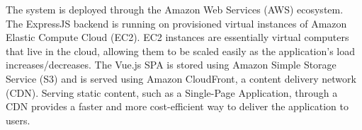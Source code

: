 The system is deployed through the Amazon Web Services (AWS) ecosystem.
The ExpressJS backend is running on provisioned virtual instances of Amazon Elastic Compute Cloud (EC2).
EC2 instances are essentially virtual computers that live in the cloud, allowing them to be scaled easily as the application's load increases/decreases.
The Vue.js SPA is stored using Amazon Simple Storage Service (S3) and is served using Amazon CloudFront, a content delivery network (CDN).
Serving static content, such as a Single-Page Application, through a CDN provides a faster and more cost-efficient way to deliver the application to users.
